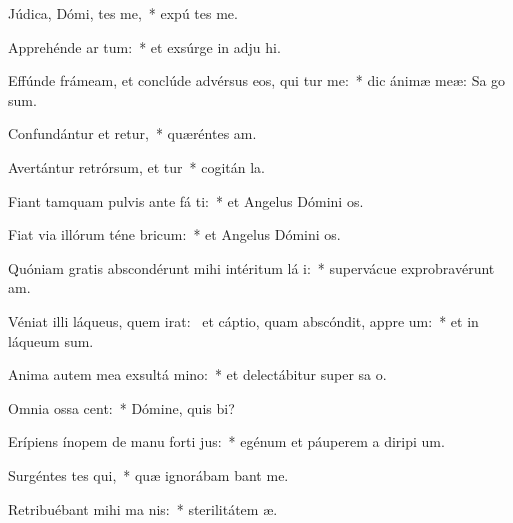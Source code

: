 \item Júdica, Dómi, tes me,~* expú tes me.
\item Apprehénde ar  tum:~* et exsúrge in adju hi.
\item Effúnde frámeam, et conclúde advérsus eos, qui tur me:~* dic ánimæ meæ: Sa  go sum.
\item Confundántur et retur,~* quæréntes  am.
\item Avertántur retrórsum, et tur~* cogitán  la.
\item Fiant tamquam pulvis ante fá ti:~* et Angelus Dómini  os.
\item Fiat via illórum téne  bricum:~* et Angelus Dómini  os.
\item Quóniam gratis abscondérunt mihi intéritum lá i:~* supervácue exprobravérunt  am.
\item Véniat illi láqueus, quem irat:~\pscross{} et cáptio, quam abscóndit, appre um:~* et in láqueum   sum.
\item Anima autem mea exsultá  mino:~* et delectábitur super sa o.
\item Omnia ossa  cent:~* Dómine, quis  bi?
\item Erípiens ínopem de manu forti jus:~* egénum et páuperem a diripi um.
\item Surgéntes tes qui,~* quæ ignorábam bant me.
\item Retribuébant mihi ma  nis:~* sterilitátem  æ.
